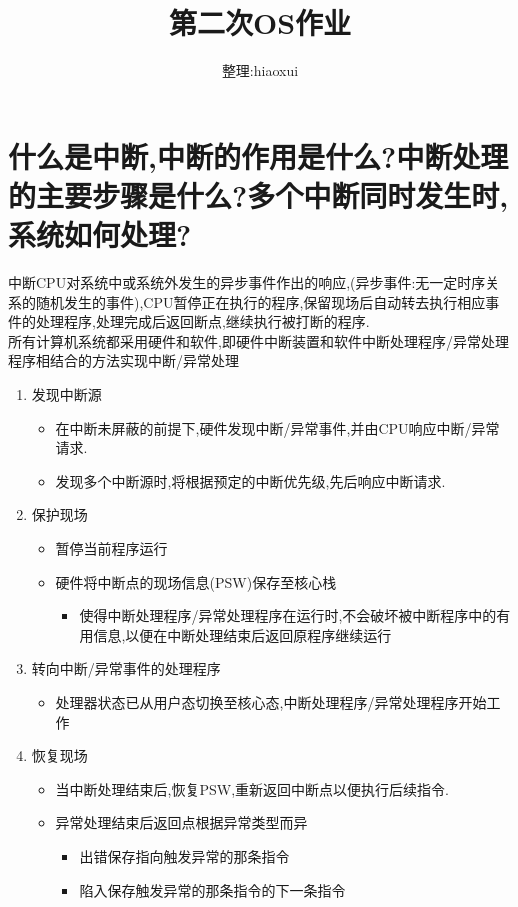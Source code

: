 \documentclass[a4paper,12pt,notitlepage]{article}
\begin{document}
\title{第二次OS作业}
\author{整理:hiaoxui}
\maketitle

\section{什么是中断,中断的作用是什么?中断处理的主要步骤是什么?多个中断同时发生时,系统如何处理?}

	中断CPU对系统中或系统外发生的异步事件作出的响应,(异步事件:无一定时序关系的随机发生的事件),CPU暂停正在执行的程序,保留现场后自动转去执行相应事件的处理程序,处理完成后返回断点,继续执行被打断的程序. \\
	
	所有计算机系统都采用硬件和软件,即硬件中断装置和软件中断处理程序/异常处理程序相结合的方法实现中断/异常处理 \\
	
\begin{enumerate}
	\item 发现中断源
	\begin{itemize}
		\item 在中断未屏蔽的前提下,硬件发现中断/异常事件,并由CPU响应中断/异常请求.
		\item 发现多个中断源时,将根据预定的中断优先级,先后响应中断请求.
	\end{itemize}
	\item 保护现场
	\begin{itemize}
		\item 暂停当前程序运行
		\item 硬件将中断点的现场信息(PSW)保存至核心栈
		\begin{itemize}
			\item 使得中断处理程序/异常处理程序在运行时,不会破坏被中断程序中的有用信息,以便在中断处理结束后返回原程序继续运行
		\end{itemize}
	\end{itemize}
	\item 转向中断/异常事件的处理程序
	\begin{itemize}
		\item 处理器状态已从用户态切换至核心态,中断处理程序/异常处理程序开始工作
	\end{itemize}
	\item 恢复现场
	\begin{itemize}
		\item 当中断处理结束后,恢复PSW,重新返回中断点以便执行后续指令.
		\item 异常处理结束后返回点根据异常类型而异
		\begin{itemize}
			\item 出错保存指向触发异常的那条指令
			\item 陷入保存触发异常的那条指令的下一条指令
		\end{itemize}
	\end{itemize}
\end{enumerate}
\end{document}
